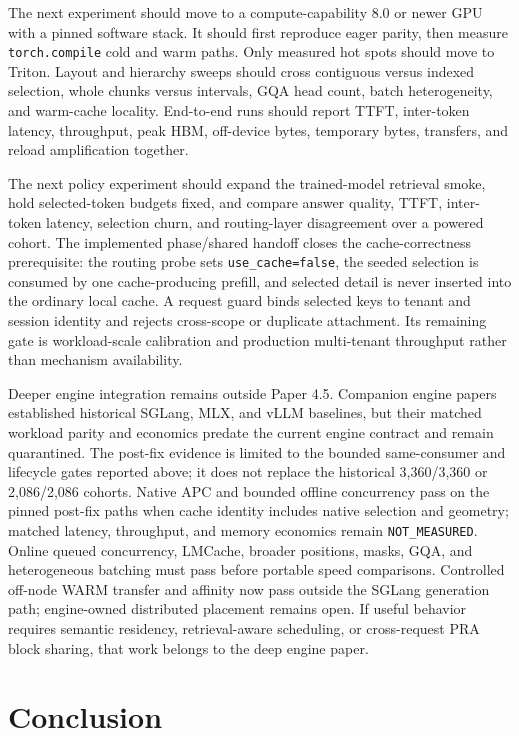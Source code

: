 \documentclass[11pt]{article}
\begin{document}
The next experiment should move to a compute-capability 8.0 or newer GPU with a
pinned software stack.  It should first reproduce eager parity, then measure
\texttt{torch.compile} cold and warm paths.  Only measured hot spots should move
to Triton.  Layout and hierarchy sweeps should cross contiguous versus indexed
selection, whole chunks versus intervals, GQA head count, batch heterogeneity,
and warm-cache locality.  End-to-end runs should report TTFT, inter-token
latency, throughput, peak HBM, off-device bytes, temporary bytes, transfers,
and reload amplification together.

The next policy experiment should expand the trained-model retrieval smoke,
hold selected-token budgets fixed, and compare answer quality, TTFT, inter-token
latency, selection churn, and routing-layer disagreement over a powered cohort.
The implemented phase/shared handoff closes the cache-correctness prerequisite:
the routing probe sets \texttt{use\_cache=false}, the seeded selection is
consumed by one cache-producing prefill, and selected detail is never inserted
into the ordinary local cache.  A request guard binds selected keys to tenant
and session identity and rejects cross-scope or duplicate attachment.  Its
remaining gate is workload-scale calibration and production multi-tenant
throughput rather than mechanism availability.

Deeper engine integration remains outside Paper 4.5. Companion engine papers
established historical SGLang, MLX, and vLLM baselines, but their matched
workload parity and economics predate the current engine contract and remain
quarantined. The post-fix evidence is limited to the bounded same-consumer and
lifecycle gates reported above; it does not replace the historical 3,360/3,360
or 2,086/2,086 cohorts. Native APC and bounded offline concurrency pass on the
pinned post-fix paths when cache identity includes native selection and
geometry; matched latency, throughput, and memory economics remain
\texttt{NOT\_MEASURED}. Online queued concurrency, LMCache, broader
positions, masks, GQA, and heterogeneous batching must pass before portable
speed comparisons. Controlled off-node WARM transfer and affinity now pass
outside the SGLang generation path; engine-owned distributed placement remains
open.
If useful behavior requires semantic residency, retrieval-aware scheduling, or
cross-request PRA block sharing, that work belongs to the deep engine paper.

\section{Conclusion}
\end{document}
